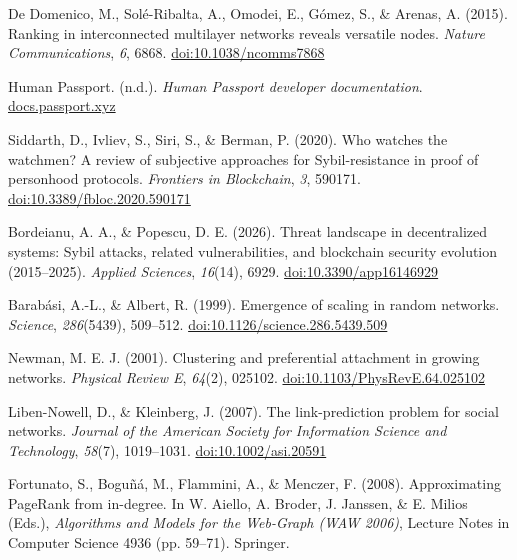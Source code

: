 \begin{enumerate}[label={[\arabic*]}, leftmargin=*, itemsep=0.35em, parsep=0pt]
  \item{}\label{ref:63} De Domenico, M., Sol\'{e}-Ribalta, A., Omodei, E., G\'{o}mez, S., \& Arenas, A. (2015). Ranking in interconnected multilayer networks reveals versatile nodes. \textit{Nature Communications}, \textit{6}, 6868. \href{https://doi.org/10.1038/ncomms7868}{doi:10.1038/ncomms7868}
  \item{}\label{ref:64} Human Passport. (n.d.). \textit{Human Passport developer documentation}. \href{https://docs.passport.xyz/}{docs.passport.xyz}
  \item{}\label{ref:65} Siddarth, D., Ivliev, S., Siri, S., \& Berman, P. (2020). Who watches the watchmen? A review of subjective approaches for Sybil-resistance in proof of personhood protocols. \textit{Frontiers in Blockchain}, \textit{3}, 590171. \href{https://doi.org/10.3389/fbloc.2020.590171}{doi:10.3389/fbloc.2020.590171}
  \item{}\label{ref:66} Bordeianu, A. A., \& Popescu, D. E. (2026). Threat landscape in decentralized systems: Sybil attacks, related vulnerabilities, and blockchain security evolution (2015--2025). \textit{Applied Sciences}, \textit{16}(14), 6929. \href{https://doi.org/10.3390/app16146929}{doi:10.3390/app16146929}
  \item{}\label{ref:67} Barab\'{a}si, A.-L., \& Albert, R. (1999). Emergence of scaling in random networks. \textit{Science}, \textit{286}(5439), 509--512. \href{https://doi.org/10.1126/science.286.5439.509}{doi:10.1126/science.286.5439.509}
  \item{}\label{ref:68} Newman, M. E. J. (2001). Clustering and preferential attachment in growing networks. \textit{Physical Review E}, \textit{64}(2), 025102. \href{https://doi.org/10.1103/PhysRevE.64.025102}{doi:10.1103/PhysRevE.64.025102}
  \item{}\label{ref:69} Liben-Nowell, D., \& Kleinberg, J. (2007). The link-prediction problem for social networks. \textit{Journal of the American Society for Information Science and Technology}, \textit{58}(7), 1019--1031. \href{https://doi.org/10.1002/asi.20591}{doi:10.1002/asi.20591}
  \item{}\label{ref:70} Fortunato, S., Bogu\~{n}\'{a}, M., Flammini, A., \& Menczer, F. (2008). Approximating PageRank from in-degree. In W. Aiello, A. Broder, J. Janssen, \& E. Milios (Eds.), \textit{Algorithms and Models for the Web-Graph (WAW 2006)}, Lecture Notes in Computer Science 4936 (pp. 59--71). Springer.

\end{enumerate}

